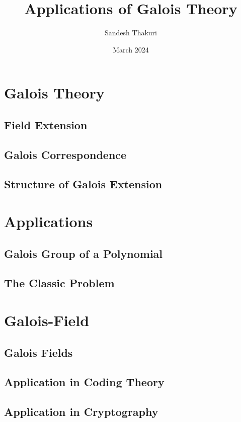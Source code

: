 \documentclass[a4paper,12pt,oneside,onecolumn,openany,final]{memoir}
\title{Applications of Galois Theory}
\author{Sandesh Thakuri}
\date{March 2024}
\begin{document}
\frontmatter








\tableofcontents  %

\mainmatter



\part{Galois Theory}
\chapter{Field Extension}


\chapter{Galois Correspondence}


\chapter{Structure of Galois Extension}


\part{Applications}
\chapter{Galois Group of a Polynomial}


\chapter{The Classic Problem}



\part{\hspace{3mm} Galois-Field}
\chapter{Galois Fields}


\chapter{Application in Coding Theory}


\chapter{Application in Cryptography}


\backmatter


\end{document}
